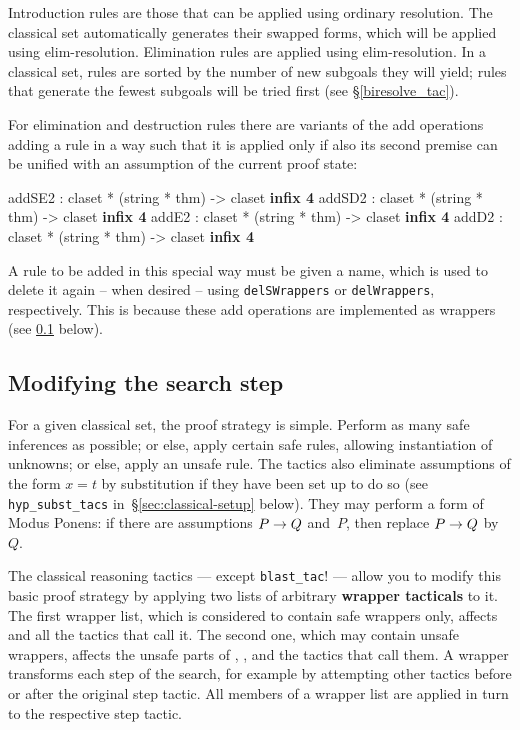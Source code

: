 Introduction rules are those that can be applied using ordinary resolution.
The classical set automatically generates their swapped forms, which will
be applied using elim-resolution.  Elimination rules are applied using
elim-resolution.  In a classical set, rules are sorted by the number of new
subgoals they will yield; rules that generate the fewest subgoals will be
tried first (see {\S}\ref{biresolve_tac}).

For elimination and destruction rules there are variants of the add operations
adding a rule in a way such that it is applied only if also its second premise
can be unified with an assumption of the current proof state:
\begin{ttbox}
addSE2      : claset * (string * thm) -> claset           \hfill{\bf infix 4}
addSD2      : claset * (string * thm) -> claset           \hfill{\bf infix 4}
addE2       : claset * (string * thm) -> claset           \hfill{\bf infix 4}
addD2       : claset * (string * thm) -> claset           \hfill{\bf infix 4}
\end{ttbox}
\begin{warn}
  A rule to be added in this special way must be given a name, which is used 
  to delete it again -- when desired -- using \texttt{delSWrappers} or 
  \texttt{delWrappers}, respectively. This is because these add operations
  are implemented as wrappers (see \ref{sec:modifying-search} below).
\end{warn}


\subsection{Modifying the search step}
\label{sec:modifying-search}
For a given classical set, the proof strategy is simple.  Perform as many safe
inferences as possible; or else, apply certain safe rules, allowing
instantiation of unknowns; or else, apply an unsafe rule.  The tactics also
eliminate assumptions of the form $x=t$ by substitution if they have been set
up to do so (see \texttt{hyp_subst_tacs} in~{\S}\ref{sec:classical-setup} below).
They may perform a form of Modus Ponens: if there are assumptions $P\rightarrow Q$
and~$P$, then replace $P\rightarrow Q$ by~$Q$.

The classical reasoning tactics --- except \texttt{blast_tac}! --- allow
you to modify this basic proof strategy by applying two lists of arbitrary 
{\bf wrapper tacticals} to it. 
The first wrapper list, which is considered to contain safe wrappers only, 
affects  and all the tactics that call it.  
The second one, which may contain unsafe wrappers, affects the unsafe parts
of , , and the tactics that call them.
A wrapper transforms each step of the search, for example 
by attempting other tactics before or after the original step tactic. 
All members of a wrapper list are applied in turn to the respective step tactic.

